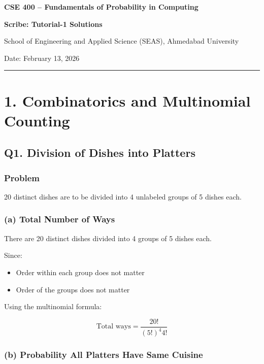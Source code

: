 \documentclass[12pt]{article}
\begin{document}
\begin{center}
\textbf{\Large CSE 400 – Fundamentals of Probability in Computing}

\vspace{0.3cm}
\textbf{Scribe: Tutorial-1 Solutions}

\vspace{0.3cm}
School of Engineering and Applied Science (SEAS), Ahmedabad University

Date: February 13, 2026
\end{center}

\hrule
\vspace{0.5cm}

\section*{1. Combinatorics and Multinomial Counting}

\subsection*{Q1. Division of Dishes into Platters}

\subsubsection*{Problem}

20 distinct dishes are to be divided into 4 unlabeled groups of 5 dishes each.

\subsubsection*{(a) Total Number of Ways}

There are 20 distinct dishes divided into 4 groups of 5 dishes each.

Since:
\begin{itemize}
    \item Order within each group does not matter
    \item Order of the groups does not matter
\end{itemize}

Using the multinomial formula:

\[
\text{Total ways} =
\frac{20!}{(5!)^4 4!}
\]

\subsubsection*{(b) Probability All Platters Have Same Cuisine}
\end{document}
